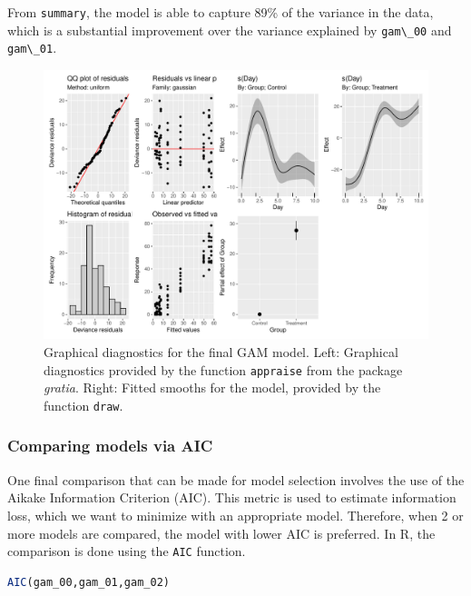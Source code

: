 \documentclass[
]{article}
\newcommand{\passthrough}[1]{#1}
\begin{document}
From \passthrough{\lstinline!summary!}, the model is able to capture 89\% of the variance in the data, which is a substantial improvement over the variance explained by \passthrough{\lstinline!gam\_00!} and \passthrough{\lstinline!gam\_01!}.



\begin{figure}

{\centering \includegraphics[width=0.75\linewidth]{SIM_Appendix_files/figure-latex/final-GAM-diag-1} 

}

\caption{Graphical diagnostics for the final GAM model. Left: Graphical diagnostics provided by the function \passthrough{\lstinline!appraise!} from the package \emph{gratia}. Right: Fitted smooths for the model, provided by the function \passthrough{\lstinline!draw!}.}\label{fig:final-GAM-diag}
\end{figure}

\hypertarget{comparing-models-via-aic}{%
\subsubsection{Comparing models via AIC}\label{comparing-models-via-aic}}

One final comparison that can be made for model selection involves the use of the Aikake Information Criterion (AIC). This metric is used to estimate information loss, which we want to minimize with an appropriate model. Therefore, when 2 or more models are compared, the model with lower AIC is preferred. In R, the comparison is done using the \passthrough{\lstinline!AIC!} function.

\begin{lstlisting}[language=R]
AIC(gam_00,gam_01,gam_02)
\end{lstlisting}
\end{document}
